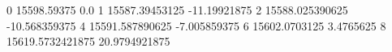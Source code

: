 0 15598.59375 0.0
1 15587.39453125 -11.19921875
2 15588.025390625 -10.568359375
4 15591.587890625 -7.005859375
6 15602.0703125 3.4765625
8 15619.5732421875 20.9794921875
